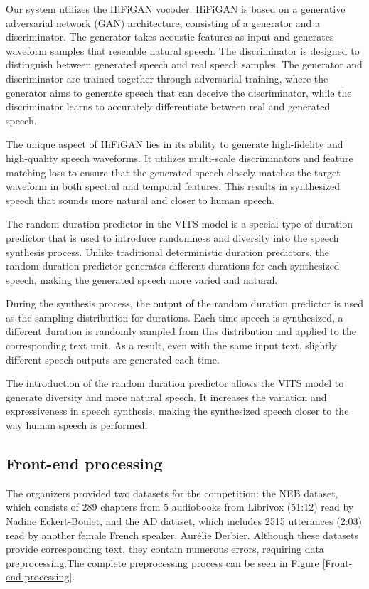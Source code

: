 \documentclass{INTERSPEECH2023}
\begin{document}
Our system utilizes the HiFiGAN vocoder. HiFiGAN is based on a generative adversarial network (GAN) architecture, consisting of a generator and a discriminator. The generator takes acoustic features as input and generates waveform samples that resemble natural speech. The discriminator is designed to distinguish between generated speech and real speech samples. The generator and discriminator are trained together through adversarial training, where the generator aims to generate speech that can deceive the discriminator, while the discriminator learns to accurately differentiate between real and generated speech.

The unique aspect of HiFiGAN lies in its ability to generate high-fidelity and high-quality speech waveforms. It utilizes multi-scale discriminators and feature matching loss to ensure that the generated speech closely matches the target waveform in both spectral and temporal features. This results in synthesized speech that sounds more natural and closer to human speech.

The random duration predictor in the VITS model is a special type of duration predictor that is used to introduce randomness and diversity into the speech synthesis process. Unlike traditional deterministic duration predictors, the random duration predictor generates different durations for each synthesized speech, making the generated speech more varied and natural.

During the synthesis process, the output of the random duration predictor is used as the sampling distribution for durations. Each time speech is synthesized, a different duration is randomly sampled from this distribution and applied to the corresponding text unit. As a result, even with the same input text, slightly different speech outputs are generated each time.

The introduction of the random duration predictor allows the VITS model to generate diversity and more natural speech. It increases the variation and expressiveness in speech synthesis, making the synthesized speech closer to the way human speech is performed.

\subsection{Front-end processing}
The organizers provided two datasets for the competition: the NEB dataset, which consists of 289 chapters from 5 audiobooks from Librivox (51:12) read by Nadine Eckert-Boulet, and the AD dataset, which includes 2515 utterances (2:03) read by another female French speaker, Aurélie Derbier. Although these datasets provide corresponding text, they contain numerous errors, requiring data preprocessing.The complete preprocessing process can be seen in Figure \ref{Front-end-processing}.
\end{document}
